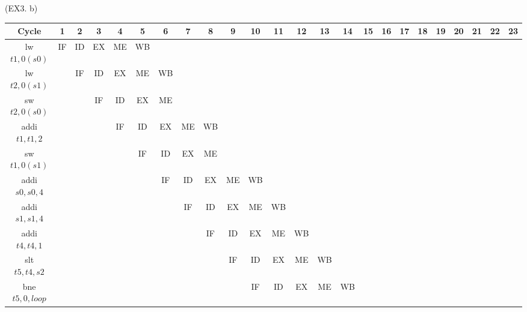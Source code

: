 \documentclass[12pt, a4paper]{article}
\begin{document}
\begin{enumerate}
      \begin{table}{(EX3. b)}
        \begin{tabular}{|c|*{23}{c|}}
        \hline
        Cycle & 1 & 2 & 3 & 4 & 5 & 6 & 7 & 8 & 9 & 10 & 11 & 12 & 13 & 14 & 15 & 16 & 17 & 18 & 19 & 20 & 21 & 22 & 23 \\
        \hline
        lw $t1, 0(s0)$ & IF & ID & \cellcolor{yellow}EX & ME & WB & & & & & & & & & & & & & & & & & & \\
        \hline
        lw $t2, 0(s1)$ & & IF & ID & \cellcolor{yellow}EX & ME & WB & & & & & & & & & & & & & & & & & \\
        \hline
        sw $t2, 0(s0)$ & & & IF & ID & \cellcolor{green}EX & ME & & & & & & & & & & & & & & & & & \\
        \hline
        addi $t1, t1, 2$ & & & & IF & ID & \cellcolor{green}EX & ME & WB & & & & & & & & & & & & & & & \\
        \hline
        sw $t1, 0(s1)$ & & & & & IF & ID & EX & ME & & & & & & & & & & & & & & & \\
        \hline
        addi $s0, s0, 4$ & & & & & & IF & ID & EX & ME & WB & & & & & & & & & & & & & \\
        \hline
        addi $s1, s1, 4$ & & & & & & & IF & ID & EX & ME & WB & & & & & & & & & & & & \\
        \hline
        addi $t4, t4, 1$ & & & & & & & & IF & ID & \cellcolor{red}EX & ME & WB & & & & & & & & & & & \\
        \hline
        slt $t5, t4, s2$ & & & & & & & & & IF & ID & \cellcolor{purple}EX & ME & WB & & & & & & & & & & \\
        \hline
        bne $t5, 0, loop$ & & & & & & & & & & IF & ID & \cellcolor{blue}EX & ME & WB & & & & & & & & & \\
        \hline
        \end{tabular}
        \end{table}
      
\end{enumerate}

\newpage
\end{document}
